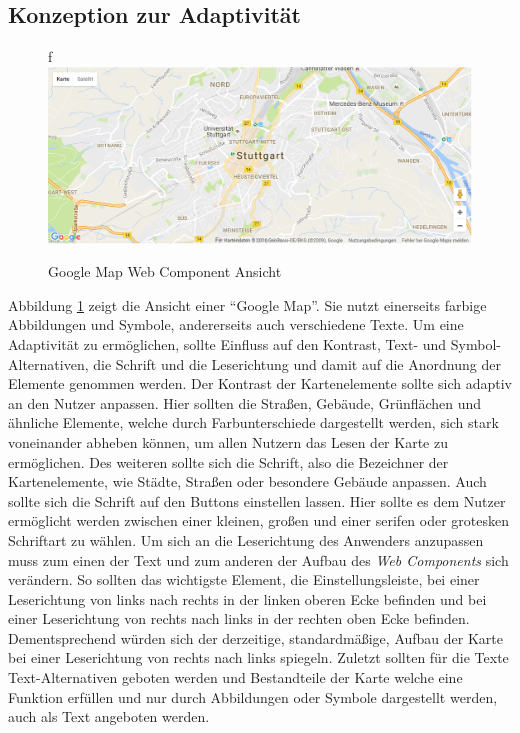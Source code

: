\documentclass[12pt, paper=a4, bibtotoc, toc=listof, headsepline=true]{scrreprt}
\begin{document}
			\subsection{Konzeption zur Adaptivität}
			\label{ref:konVonAda}
			\begin{figure}	f			\centering
				\includegraphics[width=\textwidth,height=\textheight,keepaspectratio]{gmap.png}
				\caption[Google Map Web Component]{Google Map Web Component Ansicht}
				\label{img:gmap}
			\end{figure}
			Abbildung \ref{img:gmap} zeigt die Ansicht einer \enquote{Google Map}. Sie nutzt einerseits farbige Abbildungen und Symbole, andererseits auch verschiedene Texte. Um eine Adaptivität zu ermöglichen, sollte Einfluss auf den Kontrast, Text- und Symbol-Alternativen, die Schrift und die Leserichtung und damit auf die Anordnung der Elemente genommen werden. Der Kontrast der Kartenelemente sollte sich adaptiv an den Nutzer anpassen. Hier sollten die Straßen, Gebäude, Grünflächen und ähnliche Elemente, welche durch Farbunterschiede dargestellt werden, sich stark voneinander abheben können, um allen Nutzern das Lesen der Karte zu ermöglichen. Des weiteren sollte sich die Schrift, also die Bezeichner der Kartenelemente, wie Städte, Straßen oder besondere Gebäude anpassen. Auch sollte sich die Schrift auf den Buttons einstellen lassen. Hier sollte es dem Nutzer ermöglicht werden zwischen einer kleinen, großen und einer serifen oder grotesken Schriftart zu wählen. Um sich an die Leserichtung des Anwenders anzupassen muss zum einen der Text und zum anderen der Aufbau des \emph{Web Components} sich verändern. So sollten das wichtigste Element, die Einstellungsleiste, bei einer Leserichtung von links nach rechts in der linken oberen Ecke befinden und bei einer Leserichtung von rechts nach links in der rechten oben Ecke befinden. Dementsprechend würden sich der derzeitige, standardmäßige, Aufbau der Karte bei einer Leserichtung von rechts nach links spiegeln. Zuletzt sollten für die Texte Text-Alternativen geboten werden und Bestandteile der Karte welche eine Funktion erfüllen und nur durch Abbildungen oder Symbole dargestellt werden, auch als Text angeboten werden. 
\end{document}
